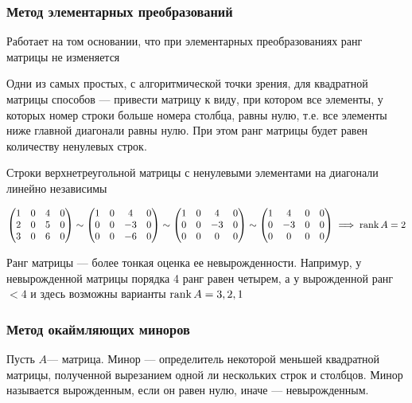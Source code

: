 \documentclass[12pt, a4paper]{article}
\begin{document}
    \subsubsection{Метод элементарных преобразований}
    Работает на том основании, что при элементарных преобразованиях ранг матрицы не изменяется

    Одни из самых простых, с алгоритмической точки зрения, для квадратной матрицы способов --- привести матрицу к виду, при котором все элементы, у которых номер строки больше номера столбца, равны нулю, т.е. все элементы ниже главной диагонали равны нулю. При этом ранг матрицы будет равен количеству ненулевых строк.
    \begin{rem}
        Строки верхнетреугольной матрицы с ненулевыми элементами на диагонали линейно независимы
        
    \end{rem}
    \begin{exmp}
        \[
            \begin{pmatrix} 1 & 0 & 4 & 0 \\ 2 & 0 & 5 & 0 \\ 3 & 0 & 6 & 0 \end{pmatrix} \sim \begin{pmatrix} 1 & 0 & 4 & 0 \\ 0 & 0 & -3 & 0 \\ 0 & 0 & -6 & 0  \end{pmatrix} \sim \begin{pmatrix} 1 & 0 & 4 & 0 \\ 0 & 0 & -3 & 0 \\ 0 & 0 & 0 & 0 \end{pmatrix} \sim \begin{pmatrix} 1 & 4 & 0 & 0 \\ 0 & -3 & 0 & 0 \\ 0 & 0 & 0 & 0 \end{pmatrix} \implies \operatorname{rank} A = 2
        \] 
        
    \end{exmp}
    \begin{rem}
        Ранг матрицы --- более тонкая оценка ее невырожденности. Напримур, у невырожденной матрицы порядка 4 ранг равен четырем, а у вырожденной ранг \( < 4 \) и здесь возможны варианты \( \operatorname{rank} A = 3, 2, 1 \)
        
    \end{rem}
    \subsubsection{Метод окаймляющих миноров}
    Пусть \( A \)--- матрица. Минор --- определитель некоторой меньшей квадратной матрицы, полученной вырезанием одной ли нескольких строк и столбцов. Минор называется вырожденным, если он равен нулю, иначе --- невырожденным.
\end{document}
